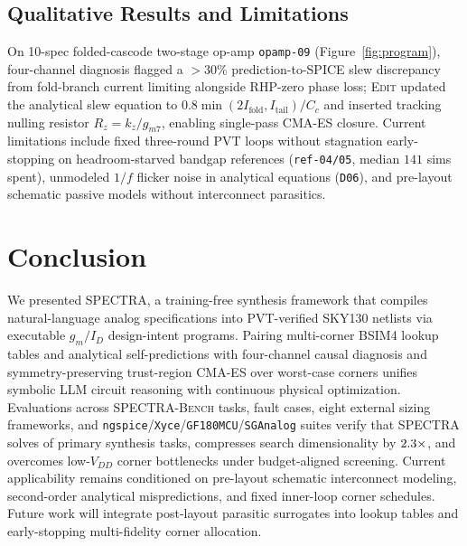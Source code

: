 \documentclass[sigconf,review,anonymous]{acmart}
\begin{document}
\subsection{Qualitative Results and Limitations}
On 10-spec folded-cascode two-stage op-amp \texttt{opamp-09} (Figure~\ref{fig:program}), four-channel diagnosis flagged a $>30\%$ prediction-to-SPICE slew discrepancy from fold-branch current limiting alongside RHP-zero phase loss; \textsc{Edit} updated the analytical slew equation to $0.8\min(2I_{\text{fold}}, I_{\text{tail}})/C_c$ and inserted tracking nulling resistor $R_z = k_z/g_{m7}$, enabling single-pass CMA-ES closure. Current limitations include fixed three-round PVT loops without stagnation early-stopping on headroom-starved bandgap references (\texttt{ref-04/05}, median $141$ sims spent), unmodeled $1/f$ flicker noise in analytical equations (\texttt{D06}), and pre-layout schematic passive models without interconnect parasitics.

\section{Conclusion}
\label{sec:conclusion}
We presented \textsc{SPECTRA}, a training-free synthesis framework that compiles natural-language analog specifications into PVT-verified SKY130 netlists via executable $g_m/I_D$ design-intent programs. Pairing multi-corner BSIM4 lookup tables and analytical self-predictions with four-channel causal diagnosis and symmetry-preserving trust-region CMA-ES over worst-case corners unifies symbolic LLM circuit reasoning with continuous physical optimization. Evaluations across \NTasksTotal{} \textsc{SPECTRA-Bench} tasks, \FaultN{} fault cases, eight external sizing frameworks, and \texttt{ngspice}/\texttt{Xyce}/\texttt{GF180MCU}/\texttt{SGAnalog} suites verify that \textsc{SPECTRA} solves \SpectraPrim{} of primary synthesis tasks, compresses search dimensionality by $2.3{}\times$, and overcomes low-$V_{DD}$ corner bottlenecks under budget-aligned screening. Current applicability remains conditioned on pre-layout schematic interconnect modeling, second-order analytical mispredictions, and fixed inner-loop corner schedules. Future work will integrate post-layout parasitic surrogates into lookup tables and early-stopping multi-fidelity corner allocation.


\clearpage

\renewcommand{\bibfont}{\fontsize{6.8}{7.5}\selectfont}
\setlength{\bibsep}{0.8pt}

\end{document}
